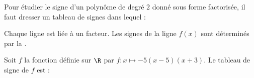 \begin{Methode}
    Pour étudier le signe d'un polynôme de degré 2 donné sous forme factorisée, il faut dresser un tableau de signes dans lequel :
    \vspace{-0.3cm}\begin{tcbenumerate}[2]
        \tcbitem Chaque ligne est liée à un facteur. 
        \tcbitem Les signes de la ligne $f(x)$ sont déterminés par la . 
    \end{tcbenumerate}
    \vspace{-0.3cm}Soit $f$ la fonction définie sur $\R$ par $f\colon x \longmapsto -5(x-5)(x+3)$. Le tableau de signe de $f$ est :
    \begin{center}
    \end{center}
\end{Methode}